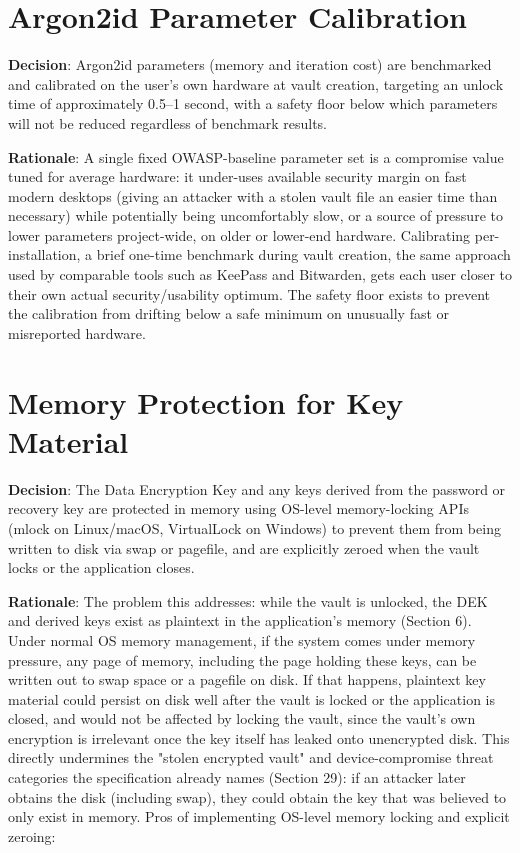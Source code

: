 \section{Argon2id Parameter Calibration}
\textbf{Decision}: Argon2id parameters (memory and iteration cost) are benchmarked and calibrated on the user's own hardware at vault creation, targeting an unlock time of approximately 0.5–1 second, with a safety floor below which parameters will not be reduced regardless of benchmark results.

\textbf{Rationale}: A single fixed OWASP-baseline parameter set is a compromise value tuned for average hardware: it under-uses available security margin on fast modern desktops (giving an attacker with a stolen vault file an easier time than necessary) while potentially being uncomfortably slow, or a source of pressure to lower parameters project-wide, on older or lower-end hardware. Calibrating per-installation, a brief one-time benchmark during vault creation, the same approach used by comparable tools such as KeePass and Bitwarden, gets each user closer to their own actual security/usability optimum. The safety floor exists to prevent the calibration from drifting below a safe minimum on unusually fast or misreported hardware.
\section{Memory Protection for Key Material}
\textbf{Decision}: The Data Encryption Key and any keys derived from the password or recovery key are protected in memory using OS-level memory-locking APIs (mlock on Linux/macOS, VirtualLock on Windows) to prevent them from being written to disk via swap or pagefile, and are explicitly zeroed when the vault locks or the application closes.

\textbf{Rationale}: The problem this addresses: while the vault is unlocked, the DEK and derived keys exist as plaintext in the application's memory (Section 6). Under normal OS memory management, if the system comes under memory pressure, any page of memory, including the page holding these keys, can be written out to swap space or a pagefile on disk. If that happens, plaintext key material could persist on disk well after the vault is locked or the application is closed, and would not be affected by locking the vault, since the vault's own encryption is irrelevant once the key itself has leaked onto unencrypted disk. This directly undermines the "stolen encrypted vault" and device-compromise threat categories the specification already names (Section 29): if an attacker later obtains the disk (including swap), they could obtain the key that was believed to only exist in memory.
Pros of implementing OS-level memory locking and explicit zeroing:

